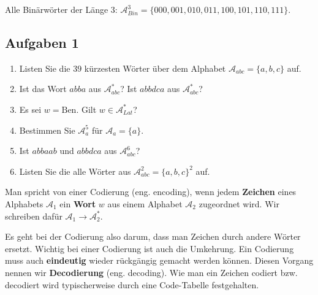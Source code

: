 \begin{example}
Alle Binärwörter der Länge $3$: $\mathscr{A}_{Bin}^3 = \{000, 001, 010, 011, 100, 101, 110, 111\}$.
\end{example}

\subsection{Aufgaben 1}

\begin{enumerate}
\item Listen Sie die $39$ kürzesten Wörter über dem Alphabet $\mathscr{A}_{abc} = \{a, b, c\}$ auf.
\item Ist das Wort $abba$ aus $\mathscr{A}_{abc}^*$? Ist $abbdca$ aus $\mathscr{A}_{abc}^*$?
\item Es sei $w = \text{Ben}$. Gilt $w \in \mathscr{A}_{Lat}^*$?
\item Bestimmen Sie $\mathscr{A}_{a}^5$ für $\mathscr{A}_{a} = \{a\}$.
\item Ist $abbaab$ und $abbdca$ aus $\mathscr{A}_{abc}^6$?
\item Listen Sie die alle Wörter aus $\mathscr{A}_{abc}^2 = \{a, b, c\}^2$ auf.
\end{enumerate}

\begin{definition}[Codierung]
Man spricht von einer Codierung (eng. encoding), wenn jedem \textbf{Zeichen} eines Alphabets $\mathscr{A}_1$ ein \textbf{Wort} $w$ aus einem Alphabet $\mathscr{A}_2$ zugeordnet wird. Wir schreiben dafür $\mathscr{A}_1 \rightarrow \mathscr{A}_2^*$.
\end{definition}

Es geht bei der Codierung also darum, dass man Zeichen durch andere Wörter ersetzt. Wichtig bei einer Codierung ist auch die Umkehrung. Ein Codierung muss auch \textbf{eindeutig} wieder rückgängig gemacht werden können. Diesen Vorgang nennen wir \textbf{Decodierung} (eng. decoding). Wie man ein Zeichen codiert bzw. decodiert wird typischerweise durch eine Code-Tabelle festgehalten. 

